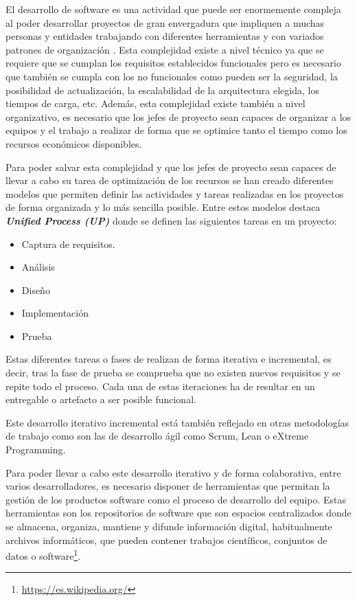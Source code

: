

El desarrollo de software es una actividad que puede ser enormemente compleja al poder desarrollar proyectos de gran envergadura que impliquen a muchas personas y entidades trabajando con diferentes herramientas y con variados patrones de organización \cite{jacobson_proceso_2000}. Esta complejidad existe a nivel técnico ya que se requiere que se cumplan los requisitos establecidos funcionales pero es necesario que también se cumpla con los no funcionales como pueden ser la seguridad, la posibilidad de actualización, la escalabilidad de la arquitectura elegida, los tiempos de carga, etc.
Además, esta complejidad existe también a nivel organizativo, es necesario que los jefes de proyecto sean capaces de organizar a los equipos y el trabajo a realizar de forma que se optimice tanto el tiempo como los recursos económicos disponibles.

Para poder salvar esta complejidad y que los jefes de proyecto sean capaces de llevar a cabo su tarea de optimización de los recursos se han creado diferentes modelos que permiten definir las actividades y tareas realizadas en los proyectos de forma organizada y lo más sencilla posible. Entre estos modelos destaca \textit{\textbf{Unified Process (UP)}} \cite{jacobson_proceso_2000} donde se definen las siguientes tareas en un proyecto: 

\begin{itemize}
	\item Captura de requisitos.
	\item Análisis
	\item Diseño
	\item Implementación
	\item Prueba
\end{itemize}

Estas diferentes tareas o fases de realizan de forma iterativa e incremental, es decir, tras la fase de prueba se comprueba que no existen nuevos requisitos y se repite todo el proceso. Cada una de estas iteraciones ha de resultar en un entregable o artefacto a ser posible funcional.

Este desarrollo iterativo incremental está también reflejado en otras metodologías de trabajo como son las de desarrollo ágil como Scrum, Lean o eXtreme Programming.


Para poder llevar a cabo este desarrollo iterativo y de forma colaborativa, entre varios desarrolladores, es necesario disponer de herramientas que permitan la gestión de los productos software como el proceso de desarrollo del equipo. Estas herramientas son los repositorios de software que son espacios centralizados donde se almacena, organiza, mantiene y difunde información digital, habitualmente archivos informáticos, que pueden contener trabajos científicos, conjuntos de datos o software\footnote{\url{https://es.wikipedia.org/}}. 

